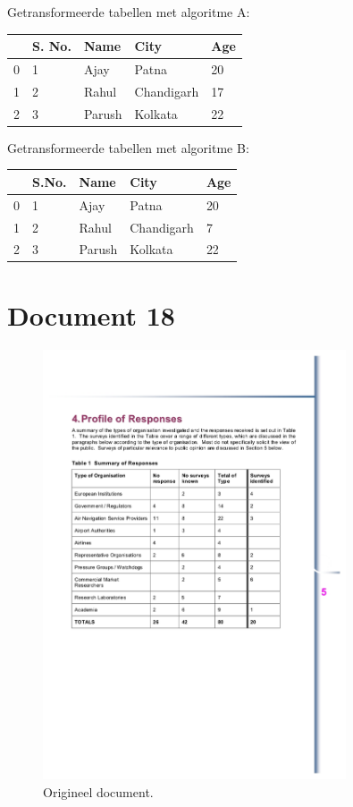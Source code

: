 Getransformeerde tabellen met algoritme A:

\begin{tabular}{lllll}
\toprule
{} & S. No. &    Name &        City & Age \\
\midrule
0 &      1 &    Ajay &       Patna &  20 \\
1 &      2 &   Rahul &  Chandigarh &  17 \\
2 &      3 &  Parush &     Kolkata &  22 \\
\bottomrule
\end{tabular}

Getransformeerde tabellen met algoritme B:

\begin{tabular}{lllll}
\toprule
{} & S.No. &    Name &        City & Age \\
\midrule
0 &     1 &    Ajay &       Patna &  20 \\
1 &     2 &   Rahul &  Chandigarh &   7 \\
2 &     3 &  Parush &     Kolkata &  22 \\
\bottomrule
\end{tabular}
\section{Document 18}

\begin{figure}[H]
    \centering
    \includegraphics[width=0.8\textwidth]{test-resultaten/18/original.png}
    \caption{Origineel document.}
\end{figure}

